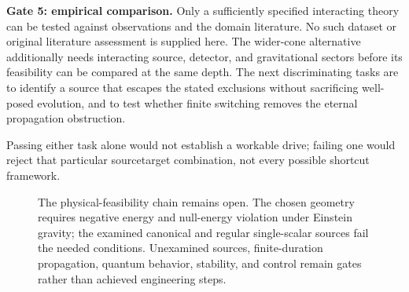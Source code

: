 \documentclass[11pt]{article}
\begin{document}
\textbf{Gate 5: empirical comparison.} Only a sufficiently specified interacting theory can be tested against observations and the domain literature. No such dataset or original literature assessment is supplied here. The wider-cone alternative additionally needs interacting source, detector, and gravitational sectors before its feasibility can be compared at the same depth. The next discriminating tasks are to identify a source that escapes the stated exclusions without sacrificing well-posed evolution, and to test whether finite switching removes the eternal propagation obstruction.

Passing either task alone would not establish a workable drive; failing one would reject that particular source\textendash{}\allowbreak{}target combination, not every possible shortcut framework.

\begin{figure}[!htbp]
\centering
{}
\caption{The physical-feasibility chain remains open. The chosen geometry requires negative energy and null-energy violation under Einstein gravity; the examined canonical and regular single-scalar sources fail the needed conditions. Unexamined sources, finite-duration propagation, quantum behavior, stability, and control remain gates rather than achieved engineering steps.}
\par{}
\end{figure}
\end{document}
